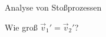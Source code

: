 \documentclass[a4paper,10pt]{scrartcl}
\begin{document}
\begin{seg}{Analyse von Stoßprozessen}
\begin{enumerate}[a]
\begin{seg}{Wie groß $\vec v_1'=\vec v_2'$?}
\begin{enumerate}[(i)]
% 
% 
% 
% 
% 
\end{enumerate}





\end{seg}
\end{enumerate}
\end{seg}
\end{document}
